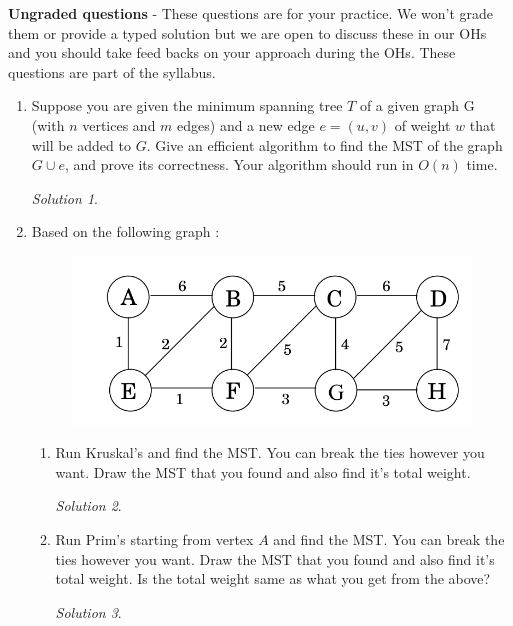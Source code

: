 \documentclass[12pt]{article}
\theoremstyle{remark}
\newtheorem*{solution}{Solution}
\begin{document}
\pagebreak
\textbf{Ungraded questions} - These questions are for your practice. We won't grade them or provide a typed solution but we are open to discuss these in our OHs and you should take feed backs on your approach during the OHs. These questions are part of the syllabus. 

\begin{enumerate}

\item Suppose you are given the minimum spanning tree $T$ of a given graph G (with $n$ vertices and $m$ edges) and a new edge $e=(u,v)$ of weight $w$ that will be added to $G$. Give an efficient algorithm to find the MST of the graph $G\cup e$, and prove its correctness. Your algorithm should run in $O(n)$ time.\\
\begin{solution}

\end{solution}

\item Based on the following graph :
\begin{figure}[h!]
\begin{center}
\includegraphics[scale=0.3]{mst_graph_q2.jpg} 
\end{center}
\end{figure}

\begin{enumerate}[label=(\alph*)]

\item Run Kruskal's and find the MST. You can break the ties however you want. Draw the MST that you found and also find it's total weight.
\begin{solution}

\end{solution}
\pagebreak
\item Run Prim's starting from vertex $A$ and find the MST. You can break the ties however you want. Draw the MST that you found and also find it's total weight. Is the total weight same as what you get from the above?
\begin{solution}


\end{solution}
\end{enumerate}
\end{enumerate}
\end{document}
